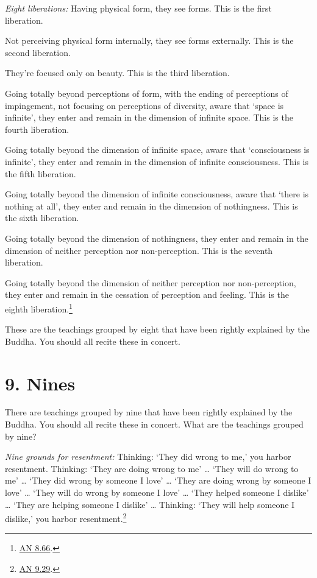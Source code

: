 \documentclass[12pt,openany]{book}%
\begin{document}
\emph{Eight liberations:} Having physical form, they see forms. This is the first liberation. 

Not perceiving physical form internally, they see forms externally. This is the second liberation. 

They’re focused only on beauty. This is the third liberation. 

Going totally beyond perceptions of form, with the ending of perceptions of impingement, not focusing on perceptions of diversity, aware that ‘space is infinite’, they enter and remain in the dimension of infinite space. This is the fourth liberation. 

Going totally beyond the dimension of infinite space, aware that ‘consciousness is infinite’, they enter and remain in the dimension of infinite consciousness. This is the fifth liberation. 

Going totally beyond the dimension of infinite consciousness, aware that ‘there is nothing at all’, they enter and remain in the dimension of nothingness. This is the sixth liberation. 

Going totally beyond the dimension of nothingness, they enter and remain in the dimension of neither perception nor non-perception. This is the seventh liberation. 

Going totally beyond the dimension of neither perception nor non-perception, they enter and remain in the cessation of perception and feeling. This is the eighth liberation.\footnote{\href{https://suttacentral.net/an8.66/en/sujato}{AN 8.66}. } 

These are the teachings grouped by eight that have been rightly explained by the Buddha. You should all recite these in concert. 

\section*{9. Nines }

There are teachings grouped by nine that have been rightly explained by the Buddha. You should all recite these in concert. What are the teachings grouped by nine? 

\emph{Nine grounds for resentment:} Thinking: ‘They did wrong to me,’ you harbor resentment. Thinking: ‘They are doing wrong to me’ … ‘They will do wrong to me’ … ‘They did wrong by someone I love’ … ‘They are doing wrong by someone I love’ … ‘They will do wrong by someone I love’ … ‘They helped someone I dislike’ … ‘They are helping someone I dislike’ … Thinking: ‘They will help someone I dislike,’ you harbor resentment.\footnote{\href{https://suttacentral.net/an9.29/en/sujato}{AN 9.29}. } 
\end{document}

